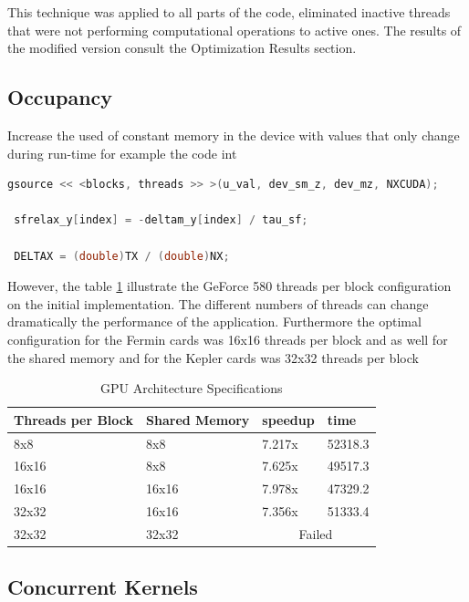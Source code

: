 This technique was applied to all parts of the code, eliminated inactive threads that were not performing computational operations to active ones. The results of the modified version consult the Optimization Results section. 

\subsection{Occupancy}
 
Increase the used of constant memory in the device with values that only change during run-time for example the code int 
 
 \begin{lstlisting}[language=C++, caption={Constant Memory changes}]
 gsource << <blocks, threads >> >(u_val, dev_sm_z, dev_mz, NXCUDA);
  
 sfrelax_y[index] = -deltam_y[index] / tau_sf;
     
 DELTAX = (double)TX / (double)NX;
\end{lstlisting}
 

However, the table \ref{tab:threads} illustrate the GeForce 580 threads per block configuration on the initial implementation. The different numbers of threads can change dramatically the performance of the application. Furthermore the optimal configuration for the Fermin cards was 16x16 threads per block and as well for the shared memory and for the Kepler cards was 32x32 threads per block 

\begin{table}[h]
\centering
  \begin{tabular} { | l | l | l | l | }
    \hline
    Threads per Block & Shared Memory & speedup & time \\
    \hline
     8x8 &  8x8 & 7.217x & 52318.3  \\
    \hline
     16x16 & 8x8 & 7.625x & 49517.3 \\
    \hline
    16x16 & 16x16 & 7.978x & 47329.2 \\
    \hline
    32x32 & 16x16 & 7.356x & 51333.4 \\
    \hline
    32x32 & 32x32 & \multicolumn{2}{|c|}{Failed}\\
    \hline
  \end{tabular}
  \caption{GPU Architecture Specifications}
  \label{tab:threads}
  \end{table}


\subsection{Concurrent Kernels}

